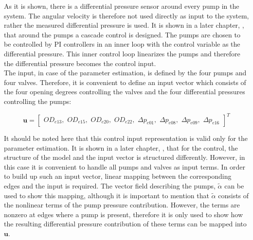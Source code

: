 As it is shown, there is a differential pressure sensor around every pump in the system. The angular velocity is therefore not used directly as input to the system, rather the measured differential pressure is used. It is shown in a later chapter, , that around the pumps a cascade control is designed. The pumps are chosen to be controlled by PI controllers in an inner loop with the control variable as the differential pressure. This inner control loop linearizes the pumps and therefore the differential pressure becomes the control input. 
\\
The input, in case of the parameter estimation, is defined by the four pumps and four valves. Therefore, it is convenient to define an input vector which consists of the four opening degrees controlling the valves and the four differential pressures controlling the pumps: 

\begin{equation}
\bm{u} =
\begin{bmatrix} 
OD_{e13},\hspace{4pt} 
OD_{e15},\hspace{4pt} 
OD_{e20},\hspace{4pt} 
OD_{e22},\hspace{4pt} 
\Delta p_{e01},\hspace{4pt} 
\Delta p_{e08},\hspace{4pt} 
\Delta p_{e09},\hspace{4pt} 
\Delta p_{e16} 
\label{inputvector}
\end{bmatrix} ^T
\end{equation}

It should be noted here that this control input representation is valid only for the parameter estimation. It is shown in a later chapter, , that for the control, the structure of the model and the input vector is structured differently. However, in this case it is convenient to handle all pumps and valves as input terms. In order to build up such an input vector, linear mapping between the corresponding edges and the input is required. The vector field describing the pumps, $\tilde\alpha$ can be used to show this mapping, although it is important to mention that $\tilde\alpha$ consists of the nonlinear terms of the pump pressure contribution. However, the terms are nonzero at edges where a pump is present, therefore it is only used to show how the resulting differential pressure contribution of these terms can be mapped into $\bm{u}$.

